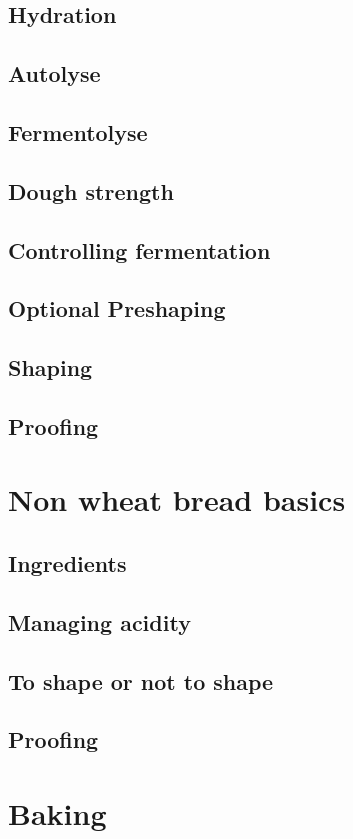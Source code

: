 \documentclass[a4paper, 12pt]{book}
\begin{document}
\section{Hydration}
\section{Autolyse}
\section{Fermentolyse}
\section{Dough strength}
\section{Controlling fermentation}
\section{Optional Preshaping}
\section{Shaping}
\section{Proofing}

\chapter{Non wheat bread basics}
\section{Ingredients}
\section{Managing acidity}
\section{To shape or not to shape}
\section{Proofing}

\chapter{Baking}
\end{document}
